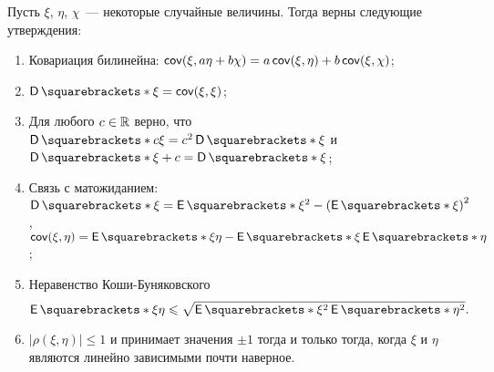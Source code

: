 \begin{lemma}
	Пусть \(\xi\), \(\eta\), \(\chi\)~--- некоторые случайные величины. Тогда 
	верны следующие утверждения:
	\begin{enumerate}
		\item Ковариация билинейна: \(\operatorname{\mathsf{cov}}(\xi, a\eta + b\chi) = a\operatorname{\mathsf{cov}}(\xi, 
		\eta) + b\operatorname{\mathsf{cov}}(\xi, \chi)\);
		\item \(\D{\xi} = \cov(\xi, \xi)\);
		\item Для любого \(c \in \mathbb{R}\) верно, что \(\D{c\xi} = c^2\D{\xi}\) и 
		\(\D{\xi + c} = \D{\xi}\);
		\item Связь с матожиданием: \(\D{\xi} = \E{\xi^2} - 
		\left(\E{\xi}\right)^2\), \(\cov(\xi, \eta) = \E{\xi\eta} - 
		\E{\xi}\E{\eta}\);
		\item Неравенство Коши-Буняковского \[\E{\xi\eta} \leq 
		\sqrt{\E{\xi^2}\E{\eta^2}}.\]
		\item \(\left|\rho(\xi, \eta)\right| \leq 1\) и принимает значения 
		\(\pm 1\) тогда и только тогда, когда \(\xi\) и \(\eta\) являются 
		линейно зависимыми почти наверное.
	\end{enumerate}
\end{lemma}
